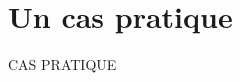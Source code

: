 \section{Un cas pratique} %

\begin{frame}{}
	
	\huge \begin{center}
		CAS PRATIQUE
	\end{center}
	

	
\end{frame}


